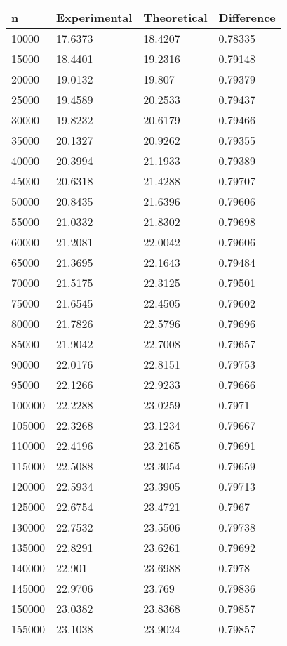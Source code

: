 \begin{table}
    \centering
\begin{tabular}{|l|l|l|l|}
\hline 
n & Experimental & Theoretical & Difference \\ 
\hline 
10000 & 17.6373 & 18.4207 & 0.78335 \\ 
15000 & 18.4401 & 19.2316 & 0.79148 \\ 
20000 & 19.0132 & 19.807 & 0.79379 \\ 
25000 & 19.4589 & 20.2533 & 0.79437 \\ 
30000 & 19.8232 & 20.6179 & 0.79466 \\ 
35000 & 20.1327 & 20.9262 & 0.79355 \\ 
40000 & 20.3994 & 21.1933 & 0.79389 \\ 
45000 & 20.6318 & 21.4288 & 0.79707 \\ 
50000 & 20.8435 & 21.6396 & 0.79606 \\ 
55000 & 21.0332 & 21.8302 & 0.79698 \\ 
60000 & 21.2081 & 22.0042 & 0.79606 \\ 
65000 & 21.3695 & 22.1643 & 0.79484 \\ 
70000 & 21.5175 & 22.3125 & 0.79501 \\ 
75000 & 21.6545 & 22.4505 & 0.79602 \\ 
80000 & 21.7826 & 22.5796 & 0.79696 \\ 
85000 & 21.9042 & 22.7008 & 0.79657 \\ 
90000 & 22.0176 & 22.8151 & 0.79753 \\ 
95000 & 22.1266 & 22.9233 & 0.79666 \\ 
100000 & 22.2288 & 23.0259 & 0.7971 \\ 
105000 & 22.3268 & 23.1234 & 0.79667 \\ 
110000 & 22.4196 & 23.2165 & 0.79691 \\ 
115000 & 22.5088 & 23.3054 & 0.79659 \\ 
120000 & 22.5934 & 23.3905 & 0.79713 \\ 
125000 & 22.6754 & 23.4721 & 0.7967 \\ 
130000 & 22.7532 & 23.5506 & 0.79738 \\ 
135000 & 22.8291 & 23.6261 & 0.79692 \\ 
140000 & 22.901 & 23.6988 & 0.7978 \\ 
145000 & 22.9706 & 23.769 & 0.79836 \\ 
150000 & 23.0382 & 23.8368 & 0.79857 \\ 
155000 & 23.1038 & 23.9024 & 0.79857 \\ 

\end{tabular}
\end{table}
